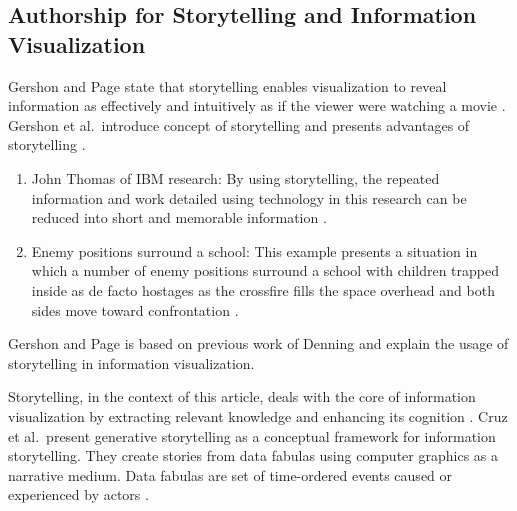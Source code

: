 \documentclass{egpubl}
\begin{document}
\subsection{Authorship for Storytelling and Information Visualization}
Gershon and Page state that storytelling enables visualization to reveal information as effectively and intuitively as if the viewer were watching a movie \cite{Gershon2}. 
Gershon et al.\ introduce concept of storytelling and presents advantages of storytelling \cite{Gershon2}.
\begin{enumerate}
\item John Thomas of IBM research: By using storytelling, the repeated information and work detailed using technology in this research can be reduced into short and memorable information \cite{Thomas}.
\item Enemy positions surround a school: This example presents a situation in which a number of enemy positions surround a school with children trapped inside as de facto hostages as the crossfire fills the space overhead and both sides move toward confrontation \cite{denning}.
\end{enumerate}
Gershon and Page is based on previous work of Denning \cite{denning} and explain the usage of storytelling in information visualization.


Storytelling, in the context of this article, deals with the core of information visualization by extracting relevant knowledge and enhancing its cognition \cite{cruz2011}.
Cruz et al.\ present generative storytelling as a conceptual framework for information storytelling. They create stories from data fabulas using computer graphics as a narrative medium. Data fabulas are set of time-ordered events caused or experienced by actors \cite{cruz2011}. 
\end{document}
